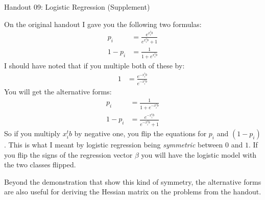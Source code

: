 \documentclass[12pt,hidelinks]{article}
\numberwithin{equation}{section}
\begin{document}
{\LARGE Handout 09: Logistic Regression (Supplement)}

\vspace*{18pt}

On the original handout I gave you the following two formulas:
\begin{align*}
p_i &= \frac{e^{x_i^t b}}{e^{x_i^t b} + 1} \\
1 - p_i &= \frac{1}{1 + e^{x_i^t b}}
\end{align*}
I should have noted that if you multiple both of these by:
\begin{align*}
1 &= \frac{e^{-x_i^t b}}{e^{-x_i^t b}}
\end{align*}
You will get the alternative forms:
\begin{align*}
p_i &= \frac{1}{1 + e^{-x_i^t b}} \\
1 - p_i &= \frac{e^{-x_i^t b}}{e^{-x_i^t b} + 1}
\end{align*}
So if you multiply $x_i^t b$ by negative one, you flip the equations for $p_i$
and $(1 - p_i)$. This is what I meant by logistic regression being \textit{symmetric}
between $0$ and $1$. If you flip the signs of the regression vector $\beta$ you will
have the logistic model with the two classes flipped.

Beyond the demonstration that show this kind of symmetry, the alternative forms
are also useful for deriving the Hessian matrix on the problems from the handout.
\end{document}
